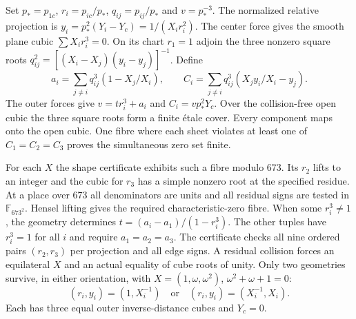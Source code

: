 \documentclass[11pt]{article}
\newcommand{\F}{\mathbb F}
\begin{document}
Set $p_*=p_{1c}$, $r_i=p_{ic}/p_*$, $q_{ij}=p_{ij}/p_*$ and $v=p_*^{-3}$. The normalized relative projection is $y_i=p_*^2(Y_i-Y_c)=1/(X_ir_i^2)$. The center force gives the smooth plane cubic $\sum X_i r_i^3=0$. On its chart $r_1=1$ adjoin the three nonzero square roots $q_{ij}^2=[(X_i-X_j)(y_i-y_j)]^{-1}$. Define
\begin{equation}\label{res}
 a_i=\sum_{j\ne i}q_{ij}^3(1-X_j/X_i),\qquad
 C_i=\sum_{j\ne i}q_{ij}^3(X_jy_i/X_i-y_j).
\end{equation}
The outer forces give $v=t r_i^3+a_i$ and $C_i=v p_*^2Y_c$. Over the collision-free open cubic the three square roots form a finite étale cover. Every component maps onto the open cubic. One fibre where each sheet violates at least one of $C_1=C_2=C_3$ proves the simultaneous zero set finite.

For each $X$ the shape certificate exhibits such a fibre modulo 673. Its $r_2$ lifts to an integer and the cubic for $r_3$ has a simple nonzero root at the specified residue. At a place over 673 all denominators are units and all residual signs are tested in $\F_{673^2}$. Hensel lifting gives the required characteristic-zero fibre. When some $r_i^3\ne1$, the geometry determines $t=(a_i-a_1)/(1-r_i^3)$. The other tuples have $r_i^3=1$ for all $i$ and require $a_1=a_2=a_3$. The certificate checks all nine ordered pairs $(r_2,r_3)$ per projection and all edge signs. A residual collision forces an equilateral $X$ and an actual equality of cube roots of unity. Only two geometries survive, in either orientation, with $X=(1,\omega,\omega^2)$, $\omega^2+\omega+1=0$:
\begin{equation}\label{two}
 (r_i,y_i)=(1,X_i^{-1})\quad\text{or}\quad (r_i,y_i)=(X_i^{-1},X_i).
\end{equation}
Each has three equal outer inverse-distance cubes and $Y_c=0$.
\end{document}
